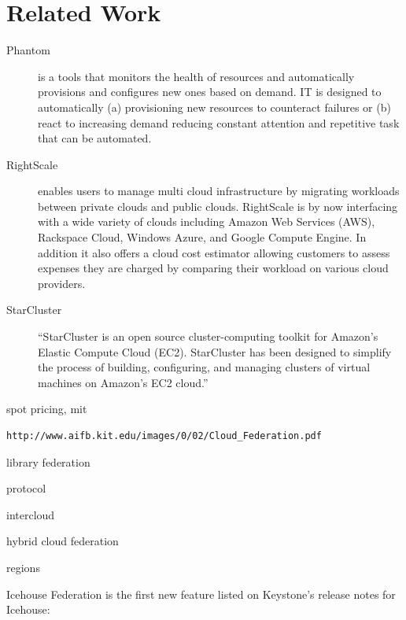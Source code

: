 \documentclass{tex/sig-alternate-2013}
\begin{document}
\section{Related Work}

\begin{description}

\item[Phantom] \cite{phantom12,www-phantom} is a tools that monitors the health of resources and
  automatically provisions and configures new ones based on demand. IT
  is designed to automatically (a) provisioning new
  resources to counteract failures or (b) react to increasing demand
  reducing  constant attention and repetitive task that can be
  automated. 

\item[RightScale] \cite{Rightscale} enables users to manage multi cloud infrastructure
  by migrating workloads between private clouds and public
  clouds. RightScale is by now interfacing with a wide variety of
  clouds including Amazon Web Services (AWS), Rackspace Cloud,
  Windows Azure, and Google Compute Engine. In addition it also offers
  a cloud cost estimator allowing customers to assess expenses 
  they are charged by comparing their workload on various cloud
  providers.

\item[StarCluster] \cite{www-starcluster} ``StarCluster is an open source cluster-computing toolkit for Amazon's Elastic Compute Cloud (EC2). StarCluster has been designed to simplify the process of building, configuring, and managing clusters of virtual machines on Amazon's EC2 cloud.''

\end{description}




spot pricing, mit 

\begin{verbatim}
http://www.aifb.kit.edu/images/0/02/Cloud_Federation.pdf
\end{verbatim}

library federation

protocol

intercloud

hybrid cloud federation

regions


Icehouse
Federation is the first new feature listed on Keystone's release notes for Icehouse:
\end{document}
